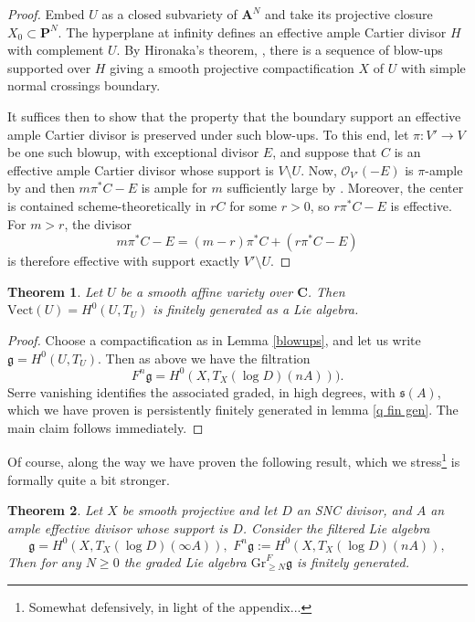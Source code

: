 \documentclass[12pt, oneside]{amsart}       %
\newtheorem{theorem}{Theorem}[section]
\theoremstyle{remark}
\renewcommand{\geq}{\geqslant}
\newcommand{\OO}{\mathcal{O}}
\newcommand{\g}{\mathfrak{g}}
\begin{document}
\begin{proof} Embed $U$ as a closed subvariety of $\mathbf A^N$ and take its projective closure $X_0\subset\mathbf P^N$. The hyperplane at infinity defines an effective ample Cartier divisor $H$ with complement $U$. By Hironaka's theorem, \cite{Hironaka}, there is a sequence of blow-ups supported over $H$ giving a smooth projective compactification $X$ of $U$ with simple normal crossings boundary.

It suffices then to show that the property that the boundary support an effective ample Cartier divisor is preserved under such blow-ups. To this end, let $\pi:V'\to V$ be one such blowup, with exceptional divisor $E$, and suppose that $C$ is an effective ample Cartier divisor whose support is $V\setminus U$. Now, $\OO_{V'}(-E)$ is $\pi$-ample by \cite[Tag 02NS]{Stacks} and then $m\pi^*C-E$ is ample for $m$ sufficiently large by \cite[Tag 0892]{Stacks}. Moreover, the center is contained scheme-theoretically in $rC$ for some $r>0$, so $r\pi^*C-E$ is effective. For $m>r$, the divisor $$m\pi^*C-E=(m-r)\pi^*C+(r\pi^*C-E)$$ is therefore effective with support exactly $V'\setminus U$. 

\end{proof}



\begin{theorem}\label{main} Let $U$ be a smooth affine variety over $\mathbf C$. Then $\mathrm{Vect}(U)=H^0(U,T_U)$ is finitely generated as a Lie algebra.
\end{theorem}

\begin{proof} Choose a compactification as in Lemma \ref{blowups}, and let us write $\g=H^0(U,T_U).$ Then as above we have the filtration $$F^n\g=H^0(X,T_X(\log D)(nA))).$$ Serre vanishing identifies the associated graded, in high degrees, with $\mathfrak{s}(A)$, which we have proven is persistently finitely generated in lemma \ref{q fin gen}. The main claim follows immediately.\end{proof}

Of course, along the way we have proven the following result, which we stress\footnote{Somewhat defensively, in light of the appendix...} is formally quite a bit stronger.

\begin{theorem}\label{real main} Let $X$ be smooth projective and let $D$ an SNC divisor, and $A$ an ample effective divisor whose support is $D$. Consider the filtered Lie algebra $$\mathfrak{g}=H^0(X,T_X(\log D)(\infty A)),\,\, F^n\g:=H^0(X,T_X(\log D)(nA)),$$  Then for any $N\geq 0$ the graded Lie algebra $\mathrm{Gr}_{\geq N}^F\g$ is finitely generated. \end{theorem}
\end{document}
